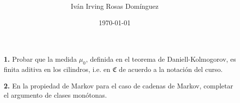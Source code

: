 \documentclass[letterpaper]{article}
\title{\textbf{}}
\author{Iván Irving Rosas Domínguez}
\date{\today}
\newcommand{\1}{\mathds{1}}
\theoremstyle{definition}
\theoremstyle{definition}
\theoremstyle{definition}
\theoremstyle{definition}
\theoremstyle{definition}
\begin{document}
\maketitle


\begin{itemize}
    \item[\textbf{1.}] Probar que la medida $\mu_0$, definida en el teorema de Daniell-Kolmogorov, es finita aditiva en los cilindros, i.e. en $\mathfrak{C}$ de acuerdo
    a la notación del curso.
    \item[\textbf{2.}] En la propiedad de Markov para el caso de cadenas de Markov, completar el argumento de clases monótonas.
    

\end{itemize}
\end{document}
